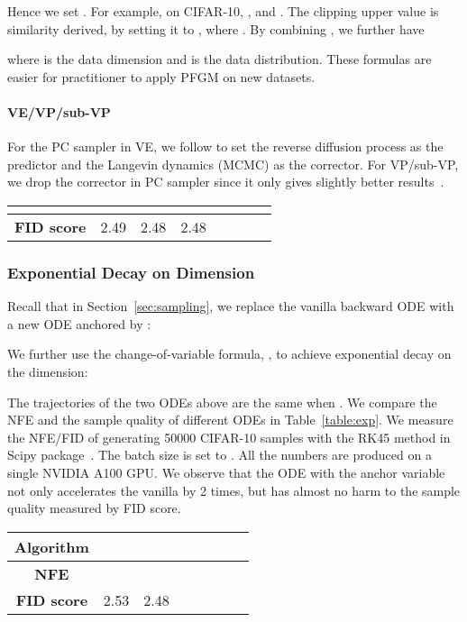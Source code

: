 Hence we set . For example, on CIFAR-10, , and . The clipping upper value is similarity derived, by setting it to , where . By combining , we further have

where  is the data dimension and  is the data distribution. These formulas are easier for practitioner to apply PFGM on new datasets.



\paragraph{VE/VP/sub-VP} For the PC sampler in VE, we follow \cite{Song2021ScoreBasedGM} to set the reverse diffusion process as the predictor and the Langevin dynamics (MCMC) as the corrector. For VP/sub-VP, we drop the corrector in PC sampler since it only gives slightly better results~\cite{Song2021ScoreBasedGM}.
\begin{table*}[htb]
\begin{center}
\caption{FID scores versus  on PFGM w/ DDPM++}
\label{table:fid-zmax}
\begin{tabular}{c c c c c c c c}
		\toprule
		\textbf{} &   & & \\
		\midrule
        \textbf{FID score} & {2.49} & {2.48} &{2.48}\\
        \bottomrule
\end{tabular}
\end{center}
\end{table*}
\subsubsection{Exponential Decay on  Dimension}
\label{app:exp}
Recall that in Section~\ref{sec:sampling}, we replace the vanilla backward ODE with a new ODE anchored by :

We further use the change-of-variable formula, \ie , to achieve exponential decay on the  dimension:


The trajectories of the two ODEs above are the same when . We compare the NFE and the sample quality of different ODEs in Table~\ref{table:exp}. We measure the NFE/FID of generating 50000 CIFAR-10 samples with the RK45 method in Scipy package~\cite{Virtanen2020SciPy1F}. The batch size is set to . All the numbers are produced on a single NVIDIA A100 GPU. We observe that the ODE with the anchor variable  not only accelerates the vanilla by 2 times, but has almost no harm to the sample quality measured by FID score.
\begin{table*}[htb]
\begin{center}
\caption{NFE and FID scores of different backward ODEs in PFGM}
\label{table:exp}
\begin{tabular}{c c c c c c c c}
		\toprule
		\textbf{Algorithm} &   &\\
		\midrule
        \textbf{NFE} &   & \\
        \textbf{FID score} & 2.53 & 2.48 \\
        \bottomrule
\end{tabular}
\end{center}
\end{table*}

